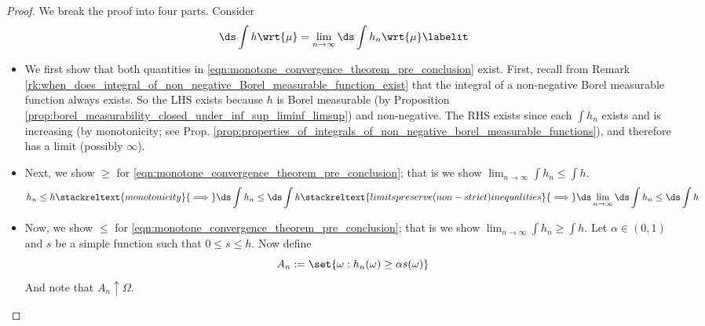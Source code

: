 \documentclass{article} %
\begin{document}
\begin{proof}

We break the proof into four parts.  Consider
\begin{align*}
\ds \int h \wrt{\mu} = \lim_{n \to \infty} \ds\int h_n \wrt{\mu}
\labelit \label{eqn:monotone_convergence_theorem_pre_conclusion}	
\end{align*}

\begin{itemize}
\item We first show that both quantities in \eqref{eqn:monotone_convergence_theorem_pre_conclusion} exist. First, recall from Remark \ref{rk:when_does_integral_of_non_negative_Borel_measurable_function_exist} that the integral of a non-negative Borel measurable function always exists. So the LHS exists because $h$ is Borel measurable (by Proposition \ref{prop:borel_measurability_closed_under_inf_sup_liminf_limsup}) and non-negative.  The RHS exists since each $\int h_n$ exists and is increasing (by monotonicity; see Prop. \ref{prop:properties_of_integrals_of_non_negative_borel_measurable_functions}), and therefore has a limit (possibly $\infty$). 

\item Next, we show $\geq$ for \eqref{eqn:monotone_convergence_theorem_pre_conclusion}; that is we show $\lim_{n \to \infty} \int h_n \leq \int h$.
\[ h_n \leq h \stackreltext{monotonicity}{\implies} \ds\int h_n \leq \ds\int h \stackreltext{limits preserve (non-strict) inequalities}{\implies} \ds\lim_{n \to \infty} \ds\int h_n \leq \ds\int h \]

\item Now, we show $\leq$ for \eqref{eqn:monotone_convergence_theorem_pre_conclusion}; that is we show $\lim_{n \to \infty} \int h_n \geq \int h$.   Let $\alpha \in (0,1)$ and $s$ be a simple function such that $0 \leq s \leq h$.  Now define 
\[ A_n := \set{\omega : h_n(\omega) \geq \alpha s(\omega) }\]
And note that $A_n \uparrow \Omega$.


\end{itemize}
\end{proof}
\end{document}
